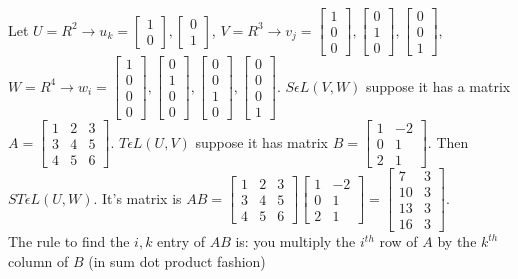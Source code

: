 \documentclass{article}
\begin{document}
Let $U = R^2 \rightarrow u_k = \begin{bmatrix} 1\\0 \end{bmatrix}, \begin{bmatrix} 0 \\ 1 \end{bmatrix}$, $V = R^3 \rightarrow v_j = \begin{bmatrix} 1\\0\\0 \end{bmatrix}, \begin{bmatrix} 0\\1\\0 \end{bmatrix}, \begin{bmatrix} 0\\0\\1 \end{bmatrix}$, $W = R^4 \rightarrow w_i = \begin{bmatrix} 1\\0\\0\\0 \end{bmatrix}, \begin{bmatrix} 0\\1\\0\\0 \end{bmatrix}, \begin{bmatrix} 0\\0\\1\\0 \end{bmatrix}, \begin{bmatrix} 0\\0\\0\\1 \end{bmatrix} $. $S\epsilon L(V,W)$ suppose it has a matrix $A = \begin{bmatrix} 1 & 2&3 \\ 3&4&5\\4&5&6 \end{bmatrix}$. $T\epsilon L(U,V)$ suppose it has matrix $B = \begin{bmatrix} 1&-2\\0&1\\2&1 \end{bmatrix}$. Then $ST \epsilon L(U,W)$. It's matrix is $AB = \begin{bmatrix} 1 & 2&3 \\ 3&4&5\\4&5&6 \end{bmatrix}\begin{bmatrix} 1&-2\\0&1\\2&1 \end{bmatrix}=\begin{bmatrix} 7&3\\10&3\\13&3\\16&3 \end{bmatrix} $. \\The rule to find the $i,k$ entry of $AB$ is: you multiply the $i^{th}$ row of $A$ by the $k^{th}$ column of $B$ (in sum dot product fashion)
\end{document}
